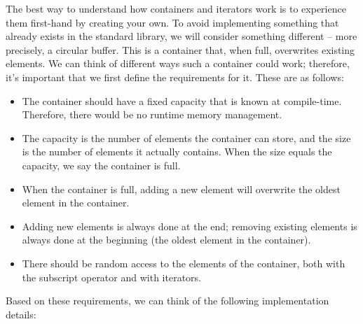 
The best way to understand how containers and iterators work is to experience them first-hand by creating your own. To avoid implementing something that already exists in the standard library, we will consider something different – more precisely, a circular buffer. This is a container that, when full, overwrites existing elements. We can think of different ways such a container could work; therefore, it’s important that we first define the requirements for it. These are as follows:

\begin{itemize}
\item
The container should have a fixed capacity that is known at compile-time. Therefore, there would be no runtime memory management.

\item
The capacity is the number of elements the container can store, and the size is the number of elements it actually contains. When the size equals the capacity, we say the container is full.

\item
When the container is full, adding a new element will overwrite the oldest element in the container.

\item
Adding new elements is always done at the end; removing existing elements is always done at the beginning (the oldest element in the container).

\item
There should be random access to the elements of the container, both with the subscript operator and with iterators.
\end{itemize}

Based on these requirements, we can think of the following implementation details:

